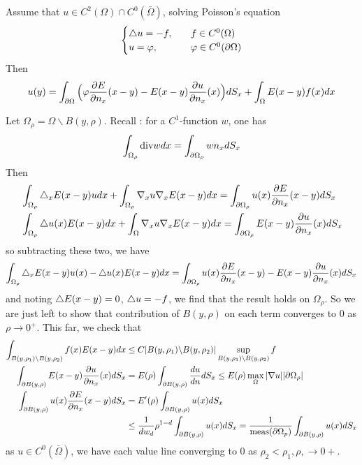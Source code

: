 \documentclass[12pt,a4paper]{article}
\newenvironment{proof}
{\begin{changemargin}{0.5cm}{0.5cm} 
	}%
	{\end{changemargin}
}
\begin{document}
 Assume that $u\in C^2(\Omega)\cap C^0(\bar{\Omega})$, solving Poisson's equation
\begin{align*}
\begin{cases}
\triangle u = - f, \quad &f \in C^0(\Omega)\\
u = \varphi, \quad &\varphi \in C^0(\partial \Omega)
\end{cases}
\end{align*}
Then
\begin{align*}
u(y) = \int_{\partial \Omega} \Big( \varphi\frac{\partial E}{\partial n_x}(x-y) - E(x-y)\frac{\partial u}{\partial n_x}(x) \Big) dS_x + \int_{\Omega} E(x-y) f(x) dx
\end{align*}
\begin{proof}
\pf Let $\Omega_{\rho} = \Omega \backslash B(y, \rho)$. Recall : for a $C^1$-function $w$, one has
\begin{align*}
\int_{\Omega_{\rho}}\text{div} w dx = \int_{\partial \Omega_{\rho}} wn_x dS_x
\end{align*}
Then
\begin{align*}
&\int_{\Omega_{\rho}} \triangle_x E(x-y) udx + \int_{\Omega_{\rho}} \nabla_x u\nabla_x E(x-y) dx = \int_{\partial \Omega_{\rho}} u(x)\frac{\partial E}{\partial n_x} (x-y) dS_x\\
& \int_{\Omega_{\rho}} \triangle u(x) E(x-y) dx + \int_{\Omega} \nabla_x u \nabla_x E(x-y) dx = \int_{\partial \Omega_{\rho}}E(x-y) \frac{\partial u}{\partial n_x}(x) dS_x
\end{align*}
so subtracting these two, we have
\begin{align*}
\int_{\Omega_{\rho}} \triangle_x E(x-y) u(x) - \triangle u(x)E(x-y) dx = \int_{\partial \Omega_{\rho}} u(x)\frac{\partial E}{\partial n_x} (x-y) - E(x-y)\frac{\partial u}{\partial n_x}(x) dS_x
\end{align*}
and noting $\triangle E(x-y) =0$, $\triangle u = -f$, we find that the result holds on $\Omega_{\rho}$. So we are just left to show that contribution of $B(y, \rho)$ on each term converges to 0 as $\rho \rightarrow 0^+$. This far, we check that
\begin{align*}
\int_{B(y, \rho_1)\backslash B(y, \rho_2)} f(x)E(x-y) dx &\leq C |B(y, \rho_1)\backslash B(y, \rho_2)| \sup_{B(y, \rho_1)\backslash B(y, \rho_2)} f \\
\int_{\partial B(y,\rho)} E(x-y) \frac{\partial u}{\partial n_x}(x)dS_x &= E(\rho) \int_{\partial B(y, \rho)} \frac{du}{dn} dS_x \leq   E(\rho) \max_{\Omega} |\nabla u| |\partial \Omega_{\rho}| \\
\int_{\partial B(y, \rho)} u(x) \frac{\partial E}{\partial n_x}(x-y) dS_x &= E'(\rho)\int_{\partial B(y, \rho)} u(x)dS_x\\
& \leq \frac{1}{dw_d} \rho^{1-d} \int_{\partial B(y, \rho)} u(x)dS_x = \frac{1}{\text{meas}(\partial \Omega_p)} \int_{\partial B(y, \rho)} u(x)dS_x
\end{align*}
as $u\in C^0(\bar{\Omega})$, we have each value line converging to 0 as $\rho_2 <\rho_1, \rho, \rightarrow 0+$.

\eop 
\end{proof}
\s
\end{document}

